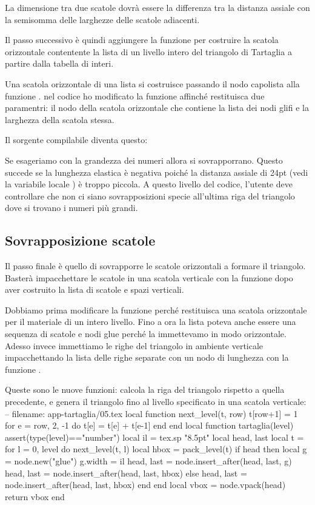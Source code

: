 La dimensione tra due scatole dovrà essere la differenza tra la distanza assiale
con la semisomma delle larghezze delle scatole adiacenti.

Il passo successivo è quindi aggiungere la funzione  per
costruire la scatola orizzontale contentente la lista di un livello intero del
triangolo di Tartaglia a partire dalla tabella di interi.

Una scatola orizzontale di una lista si costruisce passando il nodo capolista
alla funzione . nel codice ho modificato la funzione 
affinché restituisca due paramentri: il nodo della scatola orizzontale che
contiene la lista dei nodi glifi e la larghezza della scatola stessa.

Il sorgente compilabile diventa questo:

Se esageriamo con la grandezza dei numeri allora si sovrapporrano. Questo
succede se la lunghezza elastica è negativa poiché la distanza assiale di 24pt
(vedi la variabile locale ) è troppo piccola. A questo livello del
codice, l'utente deve controllare che non ci siano sovrapposizioni specie
all'ultima riga del triangolo dove si trovano i numeri più grandi.


\subsection{Sovrapposizione scatole}

Il passo finale è quello di sovrapporre le scatole orizzontali a formare il
triangolo. Basterà impacchettare le scatole in una scatola verticale con la
funzione  dopo aver costruito la lista di scatole e spazi
verticali.

Dobbiamo prima modificare la funzione  perché restituisca una
scatola orizzontale per il materiale di un intero livello. Fino a ora la lista
poteva anche essere una sequenza di scatole e nodi glue perché la immettevamo in
modo orizzontale. Adesso invece immettiamo le righe del triangolo in ambiente
verticale impacchettando la lista delle righe separate con un nodo di lunghezza
con la funzione .

Queste sono le nuove funzioni:  calcola la riga del triangolo
rispetto a quella precedente, e  genera il triangolo fino al
livello specificato in una scatola verticale:
\lines
-- filename: app-tartaglia/05.tex
local function next_level(t, row)
    t[row+1] = 1
    for e = row, 2, -1 do
        t[e] = t[e] + t[e-1]
    end
end
local function tartaglia(level)
    assert(type(level)=="number")
    local il = tex.sp "8.5pt"
    local head, last
    local t = {}
    for l = 0, level do
        next_level(t, l)
        local hbox = pack_level(t)
        if head then
            local g = node.new("glue")
            g.width = il
            head, last = node.insert_after(head, last, g)
            head, last = node.insert_after(head, last, hbox)
        else
            head, last = node.insert_after(head, last, hbox)
        end
    end
    local vbox = node.vpack(head)
    return vbox
end
\endlines
{}

